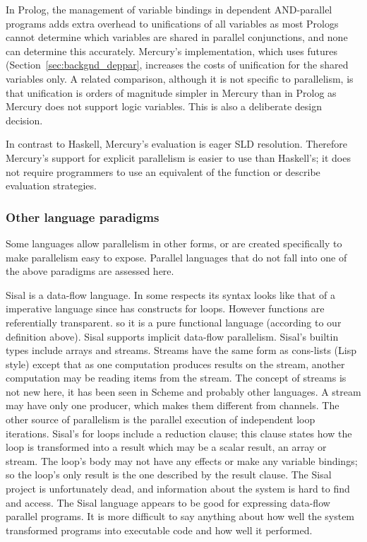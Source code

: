 In Prolog, the management of variable bindings in dependent AND-parallel
programs adds extra overhead to unifications of all variables
as most Prologs cannot determine which variables are shared in parallel
conjunctions,
and none can determine this accurately.
Mercury's implementation,
which uses futures (Section~\ref{sec:backgnd_deppar},
increases the costs of unification for the shared variables only.
A related comparison, although it is not specific to parallelism,
is that unification is orders of magnitude simpler in Mercury than in
Prolog as Mercury does not support logic variables.
This is also a deliberate design decision.

In contrast to Haskell,
Mercury's evaluation is eager SLD resolution.
Therefore Mercury's support for explicit parallelism is easier to use
than Haskell's;
it does not require programmers to use an equivalent of
the  function or describe evaluation strategies.



\subsubsection{Other language paradigms}
\label{sec:intro_par_other}

Some languages allow parallelism in other forms,
or are created specifically to make parallelism easy to expose.
Parallel languages that do not fall into one of the above paradigms are
assessed here.

Sisal \citep{feo:1990:sisal-report} is a data-flow language.
In some respects its syntax looks like that of a imperative language
since has constructs for loops.
However functions are referentially transparent.
so it is a pure functional language (according to our definition above).
Sisal supports implicit data-flow parallelism.
Sisal's builtin types include arrays and streams.
Streams have the same form as cons-lists (Lisp style) except that as one
computation produces results on the stream, another computation may be
reading items from the stream.
The concept of streams is not new here,
it has been seen in Scheme \citep{wizard-book} and probably other
languages.
A stream may have only one producer,
which makes them different from channels.
The other source of parallelism is the parallel execution of independent
loop iterations.
Sisal's for loops include a reduction clause;
this clause states how the loop is transformed into a result which may be a
scalar result, an array or stream.
The loop's body may not have any effects or make any variable bindings;
so the loop's only result is the one described by the result clause.
The Sisal project is unfortunately dead,
and information about the system is hard to find and access.
The Sisal language appears to be good for expressing data-flow
parallel programs.
It is more difficult to say anything about how well the system
transformed programs into executable code and how well it performed.

